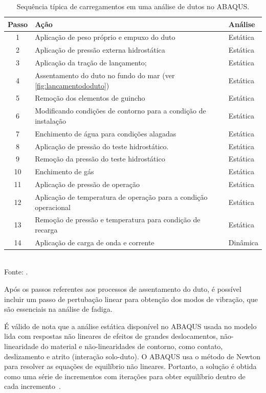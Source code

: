 \begin{table}[!ht]
\renewcommand{\arraystretch}{1.2}
\small
\centering
\caption{Sequência típica de carregamentos em uma análise de dutos no ABAQUS.}\label{tab:load_steps}
\begin{tabular}{cll}
\toprule[1.5pt]

\textbf{Passo} & \textbf{Ação} & \textbf{Análise} \\
\midrule
1 & Aplicação de peso próprio e empuxo do duto & Estática \\
2 & Aplicação de pressão externa hidrostática & Estática \\
3 & Aplicação da tração de lançamento; & Estática \\
4 & Assentamento do duto no fundo do mar (ver \autoref{fig:lancamentododuto}) & Estática \\
5 & Remoção dos elementos de guincho & Estática \\
6 & Modificando condições de contorno para a condição de instalação & Estática \\
7 & Enchimento de água para condições alagadas & Estática \\
8 & Aplicação de pressão do teste hidrostático. & Estática \\
9 & Remoção da pressão do teste hidrostático & Estática \\
10 & Enchimento de gás & Estática \\
11 & Aplicação de pressão de operação & Estática \\
12 & Aplicação de temperatura de operação para a condição operacional & Estática \\
13 & Remoção de pressão e temperatura para condição de recarga & Estática \\
14 & Aplicação de carga de onda e corrente & Dinâmica \\

\bottomrule[1.25pt]
\end{tabular}
\\[6pt]
Fonte: .
\end{table}

Após os passos referentes aos processos de assentamento do duto, é possível incluir um passo de pertubação linear para obtenção dos modos de vibração, que são essenciais na análise de fadiga.

É válido de nota que a análise estática disponível no ABAQUS usada no modelo lida com respostas não lineares de efeitos de grandes deslocamentos, não-linearidade do material e não-linearidades de contorno, como contato, deslizamento e atrito (interação solo-duto). O ABAQUS usa o método de Newton para resolver as equações de equilíbrio não lineares. Portanto, a solução é obtida como uma série de incrementos com iterações para obter equilíbrio dentro de cada incremento~\cite{SIMULIA2018}.


